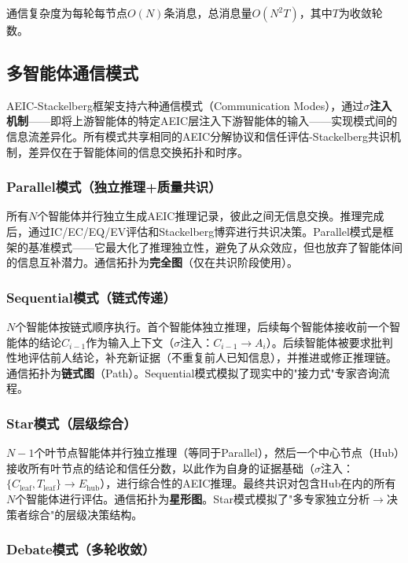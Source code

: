 \documentclass[12pt,a4paper,UTF8,fontset=fandol]{ctexart}
\begin{document}
通信复杂度为每轮每节点$O(N)$条消息，总消息量$O(N^2 T)$，其中$T$为收敛轮数。

\subsection{多智能体通信模式}\label{sec:modes}

AEIC-Stackelberg框架支持六种通信模式（Communication Modes），通过\textbf{$\sigma$注入机制}——即将上游智能体的特定AEIC层注入下游智能体的输入——实现模式间的信息流差异化。所有模式共享相同的AEIC分解协议和信任评估-Stackelberg共识机制，差异仅在于智能体间的信息交换拓扑和时序。

\subsubsection{Parallel模式（独立推理+质量共识）}

所有$N$个智能体并行独立生成AEIC推理记录，彼此之间无信息交换。推理完成后，通过IC/EC/EQ/EV评估和Stackelberg博弈进行共识决策。Parallel模式是框架的基准模式——它最大化了推理独立性，避免了从众效应，但也放弃了智能体间的信息互补潜力。通信拓扑为\textbf{完全图}（仅在共识阶段使用）。

\subsubsection{Sequential模式（链式传递）}

$N$个智能体按链式顺序执行。首个智能体独立推理，后续每个智能体接收前一个智能体的结论$C_{i-1}$作为输入上下文（$\sigma$注入：$C_{i-1} \to A_i$）。后续智能体被要求批判性地评估前人结论，补充新证据（不重复前人已知信息），并推进或修正推理链。通信拓扑为\textbf{链式图}（Path）。Sequential模式模拟了现实中的"接力式"专家咨询流程。

\subsubsection{Star模式（层级综合）}

$N-1$个叶节点智能体并行独立推理（等同于Parallel），然后一个中心节点（Hub）接收所有叶节点的结论和信任分数，以此作为自身的证据基础（$\sigma$注入：$\{C_{\text{leaf}}, T_{\text{leaf}}\} \to E_{\text{hub}}$），进行综合性的AEIC推理。最终共识对包含Hub在内的所有$N$个智能体进行评估。通信拓扑为\textbf{星形图}。Star模式模拟了"多专家独立分析$\to$决策者综合"的层级决策结构。

\subsubsection{Debate模式（多轮收敛）}
\end{document}
